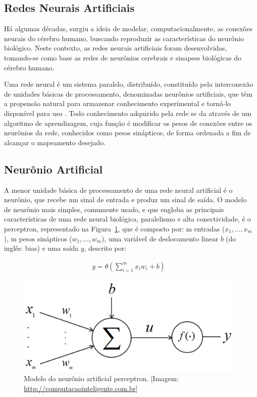 \subsection{Redes Neurais Artificiais}
\label{subsec:redes-neurais-artificiais:rna}

Há algumas décadas, surgiu a ideia de modelar, computacionalmente, as conexões neurais do cérebro humano, buscando reproduzir as características do neurônio biológico. Neste contexto, as redes neurais artificiais foram desenvolvidas, tomando-se como base as redes de neurônios cerebrais e sinapses biológicas do cérebro humano.

Uma rede neural é um sistema paralelo, distribuído, constituído pela interconexão de unidades básicas de processamento, denominadas neurônios artificiais, que têm a propensão natural para armazenar conhecimento experimental e torná-lo disponível para uso \cite{haykin2011neural}. Todo conhecimento adquirido pela rede se da através de um algoritmo de aprendizagem, cuja função é modificar os pesos de conexões entre os neurônios da rede, conhecidos como pesos sinápticos, de forma ordenada a fim de alcançar o mapeamento desejado.

\subsection{Neurônio Artificial}
\label{subsec:redes-neurais-artificiais:neuronio-artificial}

A menor unidade básica de processamento de uma rede neural artificial é o neurônio, que recebe um sinal de entrada e produz um sinal de saída. O modelo de neurônio mais simples, comumente usado, e que engloba as principais características de uma rede neural biológica, paralelismo e alta conectividade, é o perceptron, representado na Figura~\ref{figperceptron}, que é composto por: m entradas (\(x_1, \ldots ,x_m\)), m pesos sinápticos (\(w_1, \ldots , w_m\)), uma variável de deslocamento linear \(b\) (do inglês: bias) e uma saída \(y\), descrito por:

\begin{equation} \label{eqRNA6}
\begin{split}
y = \theta(\sum_{i=1}^{m} x_i w_i + b)
\end{split}
\end{equation}

\begin{figure}[ht]
\centering
\includegraphics[width=.5\textwidth]{figuras/perceptron.png}
\caption{Modelo do neurônio artificial perceptron. [Imagem: \href{ http://computacaointeligente.com.br}{ http://computacaointeligente.com.br}]}
\label{figperceptron}
\end{figure}

